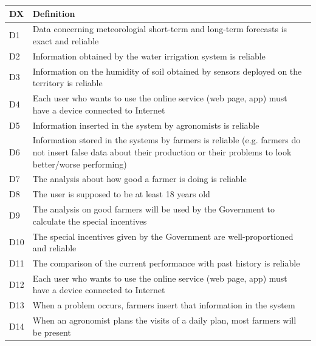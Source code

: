 \begin{table}[H]
    \setlength\arrayrulewidth{1pt}
    \centering
    \begin{tabular}{|l|m{}|}
        \rowcolor{myblue}
        \hline
        \color{white}DX & \color{white}Definition \\
        \hline
        \textsc{D1}  &    Data concerning meteorologial short-term and long-term forecasts is exact and reliable \\
        \hline
        \textsc{D2}     &   Information obtained by the water irrigation system is reliable \\
        \hline
        \textsc{D3}  &    Information on the humidity of soil obtained by sensors deployed on the territory is reliable\\
        \hline
        \textsc{D4}  &    Each user who wants to use the online service (web page, app) must have a device connected to Internet\\
        \hline
        \textsc{D5}  &    Information inserted in the system by agronomists is reliable\\
        \hline
        \textsc{D6}  &    Information stored in the systems by farmers is reliable (e.g. farmers do not insert false data about their production or their problems to look better/worse performing)\\
        \hline
        \textsc{D7}  &    The analysis about how good a farmer is doing is reliable\\
        \hline
        \textsc{D8}  &    The user is supposed to be at least 18 years old\\
        \hline
        \textsc{D9}  &    The analysis on good farmers will be used by the Government to calculate the special incentives \\
        \hline
        \textsc{D10}     &   The special incentives given by the Government are well-proportioned and reliable \\
        \hline
        \textsc{D11}  &    The comparison of the current performance with past history is reliable\\
        \hline
        \textsc{D12}  &    Each user who wants to use the online service (web page, app) must have a device connected to Internet\\
        \hline
        \textsc{D13}  &    When a problem occurs, farmers insert that information in the system\\
        \hline
        \textsc{D14}  &    When an agronomist plans the visits of a daily plan, most farmers will be present\\

\end{tabular}
\end{table}
